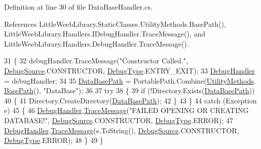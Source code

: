 Definition at line 30 of file Data\+Base\+Handler.\+cs.



References Little\+Weeb\+Library.\+Static\+Classes.\+Utility\+Methods.\+Base\+Path(), Little\+Weeb\+Library.\+Handlers.\+I\+Debug\+Handler.\+Trace\+Message(), and Little\+Weeb\+Library.\+Handlers.\+Debug\+Handler.\+Trace\+Message().


\begin{DoxyCode}
31         \{
32             debugHandler.TraceMessage(\textcolor{stringliteral}{"Constructor Called."}, \mbox{\hyperlink{namespace_little_weeb_library_1_1_handlers_a2a6ca0775121c9c503d58aa254d292be}{DebugSource}}.CONSTRUCTOR, 
      \mbox{\hyperlink{namespace_little_weeb_library_1_1_handlers_ab66019ed40462876ec4e61bb3ccb0a62}{DebugType}}.ENTRY\_EXIT);
33             \mbox{\hyperlink{class_little_weeb_library_1_1_handlers_1_1_data_base_handler_aa474a1f934032623ffb3ae5eb156148b}{DebugHandler}} = debugHandler;
34 
35             \mbox{\hyperlink{class_little_weeb_library_1_1_handlers_1_1_data_base_handler_aeea801d75a8294727c8b8e2805b43abb}{DataBasePath}} = PortablePath.Combine(\mbox{\hyperlink{class_little_weeb_library_1_1_static_classes_1_1_utility_methods}{UtilityMethods}}.
      \mbox{\hyperlink{class_little_weeb_library_1_1_static_classes_1_1_utility_methods_a9fe4cf5d219f0453436fe9c85ad261bf}{BasePath}}(), \textcolor{stringliteral}{"DataBase"});
36 
37             \textcolor{keywordflow}{try}
38             \{
39                 \textcolor{keywordflow}{if} (!Directory.Exists(\mbox{\hyperlink{class_little_weeb_library_1_1_handlers_1_1_data_base_handler_aeea801d75a8294727c8b8e2805b43abb}{DataBasePath}}))
40                 \{
41                     Directory.CreateDirectory(\mbox{\hyperlink{class_little_weeb_library_1_1_handlers_1_1_data_base_handler_aeea801d75a8294727c8b8e2805b43abb}{DataBasePath}});
42                 \}
43             \}
44             \textcolor{keywordflow}{catch} (Exception e)
45             \{
46                 \mbox{\hyperlink{class_little_weeb_library_1_1_handlers_1_1_data_base_handler_aa474a1f934032623ffb3ae5eb156148b}{DebugHandler}}.\mbox{\hyperlink{interface_little_weeb_library_1_1_handlers_1_1_i_debug_handler_a2e405bc3492e683cd3702fae125221bc}{TraceMessage}}(\textcolor{stringliteral}{"FAILED OPENING OR CREATING DATABASE!"}, 
      \mbox{\hyperlink{namespace_little_weeb_library_1_1_handlers_a2a6ca0775121c9c503d58aa254d292be}{DebugSource}}.CONSTRUCTOR, \mbox{\hyperlink{namespace_little_weeb_library_1_1_handlers_ab66019ed40462876ec4e61bb3ccb0a62}{DebugType}}.ERROR);
47                 \mbox{\hyperlink{class_little_weeb_library_1_1_handlers_1_1_data_base_handler_aa474a1f934032623ffb3ae5eb156148b}{DebugHandler}}.\mbox{\hyperlink{interface_little_weeb_library_1_1_handlers_1_1_i_debug_handler_a2e405bc3492e683cd3702fae125221bc}{TraceMessage}}(e.ToString(), 
      \mbox{\hyperlink{namespace_little_weeb_library_1_1_handlers_a2a6ca0775121c9c503d58aa254d292be}{DebugSource}}.CONSTRUCTOR, \mbox{\hyperlink{namespace_little_weeb_library_1_1_handlers_ab66019ed40462876ec4e61bb3ccb0a62}{DebugType}}.ERROR);
48             \}
49         \}
\end{DoxyCode}
